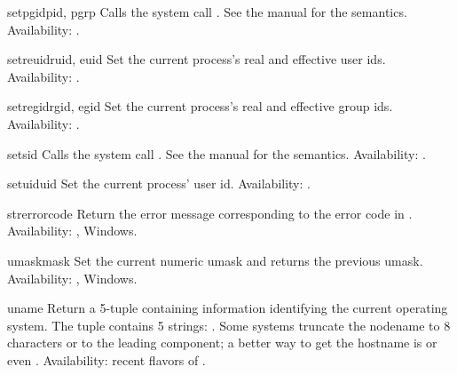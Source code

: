 \begin{funcdesc}{setpgid}{pid, pgrp}
Calls the system call .  See the \UNIX{} manual
for the semantics.
Availability: \UNIX{}.
\end{funcdesc}

\begin{funcdesc}{setreuid}{ruid, euid}
Set the current process's real and effective user ids.
Availability: \UNIX{}.
\end{funcdesc}

\begin{funcdesc}{setregid}{rgid, egid}
Set the current process's real and effective group ids.
Availability: \UNIX{}.
\end{funcdesc}

\begin{funcdesc}{setsid}{}
Calls the system call .  See the \UNIX{} manual
for the semantics.
Availability: \UNIX{}.
\end{funcdesc}

\begin{funcdesc}{setuid}{uid}
Set the current process' user id.
Availability: \UNIX{}.
\end{funcdesc}

\begin{funcdesc}{strerror}{code}
Return the error message corresponding to the error code in
.
Availability: \UNIX{}, Windows.
\end{funcdesc}

\begin{funcdesc}{umask}{mask}
Set the current numeric umask and returns the previous umask.
Availability: \UNIX{}, Windows.
\end{funcdesc}

\begin{funcdesc}{uname}{}
Return a 5-tuple containing information identifying the current
operating system.  The tuple contains 5 strings:
.  Some systems truncate the nodename to 8
characters or to the leading component; a better way to get the
hostname is 
or even
.
Availability: recent flavors of \UNIX{}.
\end{funcdesc}



